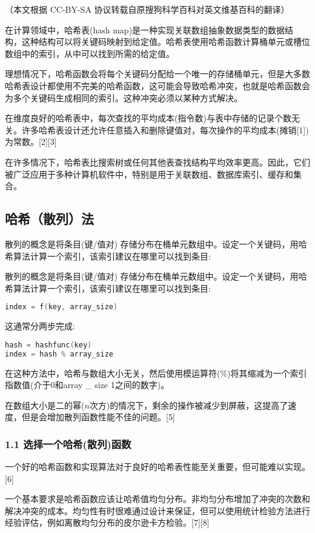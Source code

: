 
（本文根据 CC-BY-SA 协议转载自原搜狗科学百科对英文维基百科的翻译）

在计算领域中，哈希表(hash map)是一种实现关联数组抽象数据类型的数据结构，这种结构可以将关键码映射到给定值。哈希表使用哈希函数计算桶单元或槽位数组中的索引，从中可以找到所需的给定值。

理想情况下，哈希函数会将每个关键码分配给一个唯一的存储桶单元，但是大多数哈希表设计都使用不完美的哈希函数，这可能会导致哈希冲突，也就是哈希函数会为多个关键码生成相同的索引。这种冲突必须以某种方式解决。

在维度良好的哈希表中，每次查找的平均成本(指令数)与表中存储的记录个数无关。许多哈希表设计还允许任意插入和删除键值对，每次操作的平均成本(摊销[1])为常数。[2][3]

在许多情况下，哈希表比搜索树或任何其他表查找结构平均效率更高。因此，它们被广泛应用于多种计算机软件中，特别是用于关联数组、数据库索引、缓存和集合。

\subsection{ 哈希（散列）法}
散列的概念是将条目(键/值对) 存储分布在桶单元数组中。设定一个关键码，用哈希算法计算一个索引，该索引建议在哪里可以找到条目:

散列的概念是将条目(键/值对) 存储分布在桶单元数组中。设定一个关键码，用哈希算法计算一个索引，该索引建议在哪里可以找到条目:
\begin{lstlisting}[language=cpp]
index = f(key, array_size)
\end{lstlisting}
这通常分两步完成:
\begin{lstlisting}[language=cpp]
hash = hashfunc(key)
index = hash % array_size
\end{lstlisting}
在这种方法中，哈希与数组大小无关，然后使用模运算符(\%)将其缩减为一个索引指数值(介于0和array _ size 1之间的数字)。

在数组大小是二的幂($n$次方)的情况下，剩余的操作被减少到屏蔽，这提高了速度，但是会增加散列函数性能不佳的问题。[5]

\subsubsection{1.1 选择一个哈希(散列)函数}
一个好的哈希函数和实现算法对于良好的哈希表性能至关重要，但可能难以实现。[6]

一个基本要求是哈希函数应该让哈希值均匀分布。非均匀分布增加了冲突的次数和解决冲突的成本。均匀性有时很难通过设计来保证，但可以使用统计检验方法进行经验评估，例如离散均匀分布的皮尔逊卡方检验。[7][8]

